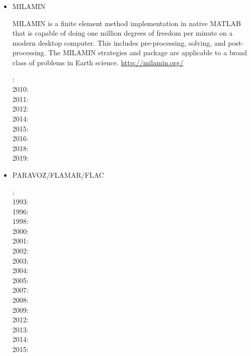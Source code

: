 \begin{itemize}
\item MILAMIN

MILAMIN is a finite element method implementation in native MATLAB that is capable of doing one million degrees of freedom per minute on a modern desktop computer. This includes pre-processing, solving, and post-processing. The MILAMIN strategies and package are applicable to a broad class of problems in Earth science. \url{http://milamin.org/}

: \cite{daks08}\\
2010: \cite{krda10}\cite{kaus10}\\
2011: \cite{yakm11}\\
2012: \cite{gebk12}\\
2014: \cite{jobk14}\\
2015: \cite{lukz15}\cite{gehm15}\cite{thkp15}\cite{musd15}\\
2016: \cite{jads16}\cite{maka16}\\
2018: \cite{dusd18}\cite{jasc18}\cite{jadg18}\cite{comj18}\cite{jens18}\cite{rabw18}\cite{chsm18}\\
2019: \cite{anpa19}\cite{sifg19}\cite{baba19}


\item PARAVOZ/FLAMAR/FLAC

: \cite{cund89}\\
1993: \cite{poli93}\\
1996: \cite{hach96}\\
1998: \cite{gepd98}\\
2000: \cite{labp00}\\
2001: \cite{bujl01}\cite{bupo01}\\
2002: \cite{bast02}\cite{clbb02}\\
2003: \cite{hags03}\cite{gehd03}\cite{upke03}\\
2004: \cite{guhl04}\cite{gewi04}\cite{toba04}\cite{tibb04}\\
2005: \cite{bugu05}\\
2007: \cite{yaab07}\cite{buto07}\\
2008: \cite{yaba08}\cite{tibb08}\\
2009: \cite{gecm09}\cite{yahb09}\cite{bucl09}\\
2012: \cite{anwb12}\cite{gech12}\cite{gubc12}\cite{gerb12}\\
2013: \cite{wabd13}\cite{frbm13}\\
2014: \cite{frba14}\cite{gagb14}\cite{bufa14}\\
2015: \cite{wulc15}\cite{marl15}\cite{gebw15}\cite{svlh15}\\





\end{itemize}

